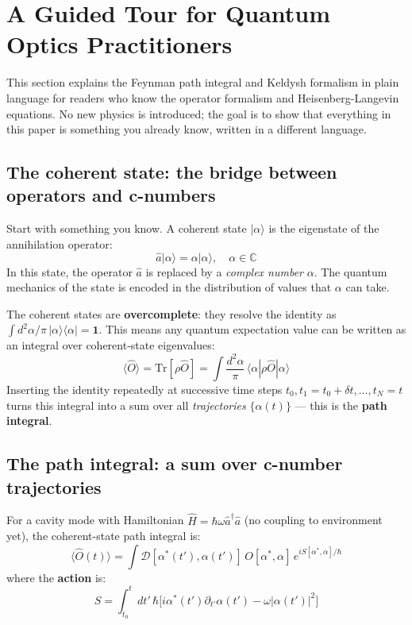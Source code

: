 \documentclass[12pt]{article}
\begin{document}
\section{A Guided Tour for Quantum Optics Practitioners}
\label{sec:tutorial}

This section explains the Feynman path integral and Keldysh formalism
in plain language for readers who know the operator formalism and
Heisenberg-Langevin equations.  No new physics is introduced; the goal
is to show that everything in this paper is something you already know,
written in a different language.

\subsection{The coherent state: the bridge between operators and c-numbers}

Start with something you know.  A coherent state $|\alpha\rangle$ is the
eigenstate of the annihilation operator:
\begin{equation}
  \hat{a}|\alpha\rangle = \alpha|\alpha\rangle,\quad
  \alpha\in\mathbb{C}
  \label{eq:coherent}
\end{equation}
In this state, the operator $\hat{a}$ is replaced by a
\emph{complex number} $\alpha$.  The quantum mechanics of the state
is encoded in the distribution of values that $\alpha$ can take.

The coherent states are \textbf{overcomplete}: they resolve the identity as
$\int d^2\alpha/\pi\,|\alpha\rangle\langle\alpha| = \mathbf{1}$.
This means any quantum expectation value can be written as an integral
over coherent-state eigenvalues:
\begin{equation}
  \langle\hat{O}\rangle =
  \mathrm{Tr}[\rho\hat{O}] =
  \int\frac{d^2\alpha}{\pi}\,\langle\alpha|\rho\hat{O}|\alpha\rangle
  \label{eq:expect_cs}
\end{equation}
Inserting the identity repeatedly at successive time steps $t_0,
t_1=t_0+\delta t, \ldots, t_N = t$ turns this integral into a sum over
all \emph{trajectories} $\{\alpha(t)\}$ — this is the \textbf{path integral}.

\subsection{The path integral: a sum over c-number trajectories}

For a cavity mode with Hamiltonian $\hat{H} = \hbar\omega\hat{a}^\dagger\hat{a}$
(no coupling to environment yet), the coherent-state path integral is:
\begin{equation}
  \langle\hat{O}(t)\rangle =
  \int\mathcal{D}[\alpha^*(t'),\alpha(t')]\,
  O[\alpha^*,\alpha]\,
  e^{iS[\alpha^*,\alpha]/\hbar}
  \label{eq:path_integral_simple}
\end{equation}
where the \textbf{action} is:
\begin{equation}
  S = \int_{t_0}^t dt'\,\hbar\bigl[
  i\alpha^*(t')\partial_{t'}\alpha(t') - \omega|\alpha(t')|^2\bigr]
  \label{eq:action_simple}
\end{equation}
\end{document}
